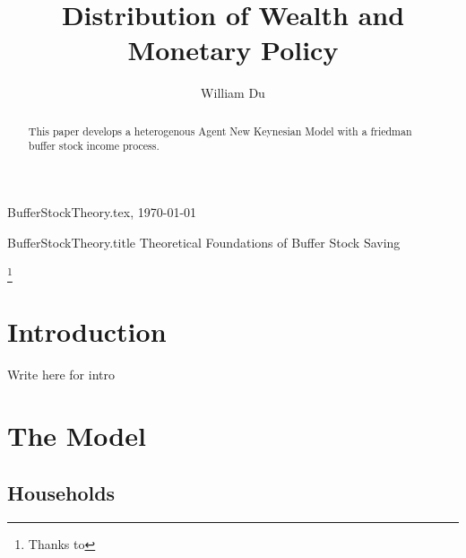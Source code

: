 \documentclass[titlepage]{\econtex}\providecommand{\texname}{BufferStockTheory}
\providecommand{\onlyinsubfile}{}
\providecommand{\notinsubfile}{}
\renewcommand{\onlyinsubfile}[1]{}
\renewcommand{\notinsubfile}[1]{#1}
\begin{document}

\renewcommand{\onlyinsubfile}[1]{}\renewcommand{\notinsubfile}[1]{#1} 

\hfill{\tiny \texname.tex, \today}

\begin{verbatimwrite}{\texname.title}
Theoretical Foundations of Buffer Stock Saving
\end{verbatimwrite}


\title{Distribution of Wealth and Monetary Policy}

\author{William Du\authNum}





\maketitle 


\hypertarget{abstract}{}
\begin{abstract}
  This paper develops a heterogenous Agent New Keynesian Model with a friedman buffer stock income process.
\end{abstract}


\begin{authorsinfo}
\end{authorsinfo}

\thanks{Thanks to }

\titlepagefinish


\newtheorem{defn}{Definition}
\newtheorem{theorem}{Theorem}

\hypertarget{Introduction}{}
\section{Introduction}

\label{sec:intro}


Write here for intro



\hypertarget{The-Model}{}
\section{The Model}

\subsection{Households}
\label{subsec:Households} 
\end{document}
